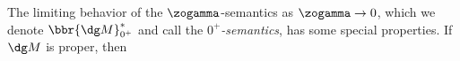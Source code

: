 The limiting behavior of the $\zogamma$-semantics as $\zogamma \to 0$,
% 
which we denote $\bbr{\dg M}^*_{0^+}$ and call the \emph{$0^+$\!-semantics},
has some special properties.
%
If $\dg M$ is proper, then        
